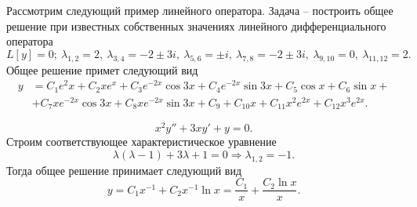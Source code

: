         Рассмотрим следующий пример линейного оператора. Задача -- построить общее решение при известных собственных значениях линейного дифференциального оператора
        \[
            L[y] = 0; ~ \lambda_{1, 2} = 2, ~ \lambda_{3, 4} = -2 \pm 3i, ~ \lambda_{5, 6} = \pm i, ~ \lambda_{7, 8} = -2 \pm 3i, ~ \lambda_{9, 10} = 0, ~ \lambda_{11, 12} = 2.
        \]
        Общее решение примет следующий вид
        \[
            \begin{split}
                y &= C_1 e^2x + C_2 xe^x + C_3 e^{-2x} \cos{3x} + C_4 e^{-2x} \sin{3x} + C_5 \cos{x} + C_6 \sin{x} + \\ &+ C_7 xe^{-2x} \cos{3x} + C_8 xe^{-2x} \sin{3x} + C_9 + C_{10} x + C_{11} x^2 e^{2x} + C_{12} x^3 e^{2x}.
            \end{split}
        \]

        \[
            x^2y'' + 3xy' + y = 0.
        \]
        Строим соответствующее характеристическое уравнение
        \[
            \lambda (\lambda - 1)  + 3 \lambda + 1 = 0 \Longrightarrow \lambda_{1, 2} = -1.
        \]
        Тогда общее решение принимает следующий вид
        \[
            y = C_1 x^{-1} + C_2 x^{-1} \ln{x} = \dfrac{C_1}{x} + \dfrac{C_2 \ln{x}}{x}.
        \]
